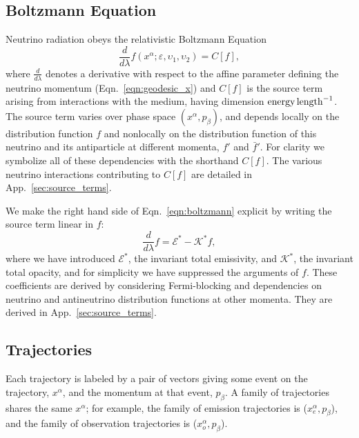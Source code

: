 \documentclass[aps,prd,twocolumn,superscriptaddress]{revtex4-1}
\newcommand{\todo}[1]{\marginpar{\tiny{\textcolor{red}{#1}}}}
\begin{document}
\subsection{Boltzmann Equation}
\label{ssec:boltzmann}
Neutrino radiation obeys the relativistic Boltzmann Equation
\todo{point out limit of QKEs}
\begin{equation}
  \label{eqn:boltzmann}
  \frac{d}{d\lambda}f(x^\alpha;\varepsilon,\upsilon_1,\upsilon_2) = C[f],
\end{equation}
where $\frac{d}{d\lambda}$ denotes a derivative with respect to the affine
parameter defining the neutrino momentum (Eqn.~\ref{eqn:geodesic_x})
and $C[f]$ is the source term arising from interactions with the medium,
having dimension ${\rm energy}\,{\rm length}^{-1}$.
The source term varies over phase space $(x^\alpha,p_\beta)$,
and depends locally on the distribution function $f$
and nonlocally on the distribution function of this neutrino and its
antiparticle at different momenta, $f'$ and $\bar{f}'$.
For clarity we symbolize all of these dependencies with the shorthand $C[f]$.
The various neutrino interactions contributing to $C[f]$ are detailed in
App.~\ref{sec:source_terms}.

We make the right hand side of Eqn.~\ref{eqn:boltzmann} explicit by writing
the source term linear in $f$:
\begin{equation}
  \label{eqn:boltzmann_linear}
  \frac{d}{d\lambda}f =
  \mathscr{E}^* - \mathscr{K}^* f,
\end{equation}
where we have introduced
$\mathscr{E}^*$, the invariant total emissivity, and
$\mathscr{K}^*$, the invariant total opacity,
and for simplicity we have suppressed the arguments of $f$.
These coefficients are derived by considering Fermi-blocking and
dependencies on neutrino and antineutrino distribution functions at other
momenta.
They are derived in App.~\ref{sec:source_terms}.

\subsection{Trajectories}
\label{ssec:trajectories}
Each trajectory is labeled by a pair of vectors
giving some event on the trajectory, $x^\alpha$,
and the momentum at that event, $p_\beta$.
A family of trajectories shares the same $x^\alpha$; for example,
the family of emission trajectories is ($x^\alpha_e,p_\beta$),
and the family of observation trajectories is ($x^\alpha_o,p_\beta$).
\end{document}
